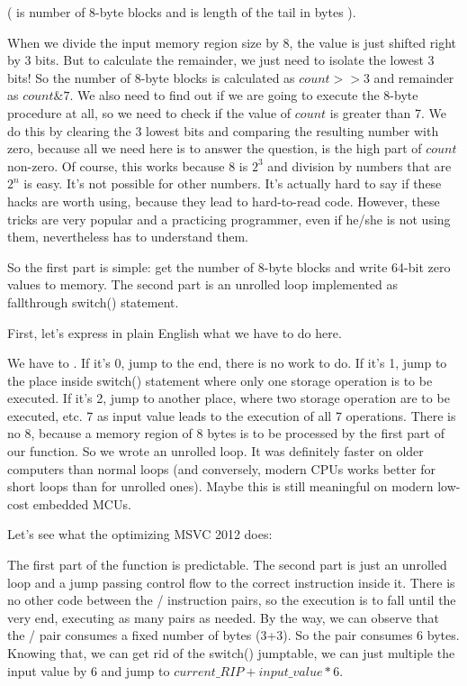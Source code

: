 (  is number of 8-byte blocks and  is length of the tail in bytes ).

When we divide the input memory region size by 8, the value is just shifted right by 3 bits.
But to calculate the remainder, we just need to isolate the lowest 3 bits!
So the number of 8-byte blocks is calculated as $count>>3$ and remainder as $count \& 7$.
We also need to find out if we are going to execute the 8-byte procedure at all, so we need
to check if the value of $count$ is greater than 7.
We do this by clearing the 3 lowest bits and comparing the resulting number with zero, because 
all we need here is to answer the question, is the high part of $count$ non-zero.
Of course, this works because 8 is $2^{3}$ and division by numbers that are $2^n$ is easy.
It's not possible for other numbers.
It's actually hard to say if these hacks are worth using, because they lead
to hard-to-read code.
However, these tricks are very popular and a practicing programmer, 
even if he/she is not using them, nevertheless has to understand them.

So the first part is simple: get the number of 8-byte blocks and write 64-bit zero values to memory.
The second part is an unrolled loop implemented as fallthrough switch() statement.

First, let's express in plain English what we have to do here.

We have to .
If it's 0, jump to the end, there is no work to do.
If it's 1, jump to the place inside switch() statement where only one storage operation
is to be executed.
If it's 2, jump to another place, where two storage operation are to be executed, etc.
7 as input value leads to the execution of all 7 operations.
There is no 8, because a memory region of 8 bytes is to be processed by the first part of our function.
So we wrote an unrolled loop.
It was definitely faster on older computers than normal loops (and conversely,
modern CPUs works better for short loops than for unrolled ones).
Maybe this is still meaningful on modern low-cost embedded \ac{MCU}s.

Let's see what the optimizing MSVC 2012 does:



The first part of the function is predictable.
The second part is just an unrolled loop and a jump passing control flow to the correct instruction
inside it.
There is no other code between the / instruction pairs, 
so the execution is to fall until the very end, executing as many pairs as needed.
By the way, we can observe that the / pair consumes a fixed number of bytes (3+3).
So the pair consumes 6 bytes.
Knowing that, we can get rid of the switch() jumptable, we can just multiple the input value by 6
and jump to $current\_RIP + input\_value * 6$.


